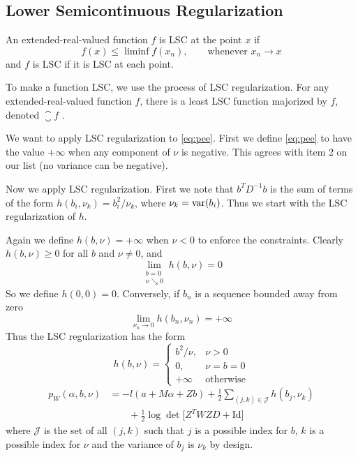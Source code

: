 \subsection{Lower Semicontinuous Regularization}
\label{sec:lsc}

An extended-real-valued function $f$ is LSC at the point $x$ if
$$
   f(x) \le \liminf f(x_n), \qquad \text{whenever $x_n \to x$}
$$
and $f$ is LSC if it is LSC at each point.

To make a function LSC, we use the process of LSC regularization.
For any extended-real-valued function $f$, there is a least LSC function
majorized by $f$, denoted $\closure f$ \citep[Section~1.D]{rockafellar-wets}.

We want to apply LSC regularization to \eqref{eq:pee}.  First we define
\eqref{eq:pee} to have the value $+\infty$ when any component of $\nu$ is
negative.  This agrees with item 2 on our list (no variance can be negative).

Now we apply LSC regularization.  First we note that $b^T D^{-1} b$ is the
sum of terms of the form $h(b_i, \nu_k) = b_i^2 / \nu_k$,
where $\nu_k = \operatorname{var}(b_i)$.  Thus we start with the LSC regularization of $h$.

Again we define $h(b, \nu) = +\infty$ when $\nu < 0$ to enforce
the constraints.  Clearly $h(b, \nu) \ge 0$ for all $b$ and $\nu \neq 0$, and
$$
   \lim_{\substack{b = 0 \\ \nu \searrow 0}} h(b, \nu) = 0
$$
So we define $h(0, 0) = 0$.  Conversely, if $b_n$ is a sequence bounded
away from zero
$$
   \lim_{\nu_n \to 0} h(b_n, \nu_n) = + \infty
$$
Thus the LSC regularization has the form
$$
   h(b, \nu) =
   \begin{cases}
   b^2 / \nu, & \nu > 0
   \\
   0, & \nu = b = 0
   \\
   +\infty & \text{otherwise}
   \end{cases}
$$
\begin{equation} \label{eq:pee-lsc}
\begin{split}
   p_W(\alpha, b, \nu)
   & =
   - l(a + M \alpha + Z b)
   + \tfrac{1}{2} \sum_{(j, k) \in \mathcal{J}} h(b_j, \nu_k)
   \\
   & \qquad
   + \tfrac{1}{2} \log \det \bigl[ Z^T W Z D + \text{Id}
   \bigr]
\end{split}
\end{equation}
where $\mathcal{J}$ is the set of all $(j, k)$ such that $j$ is a possible
index for $b$, $k$ is a possible index for $\nu$ and the variance of $b_j$
is $\nu_k$ by design.

